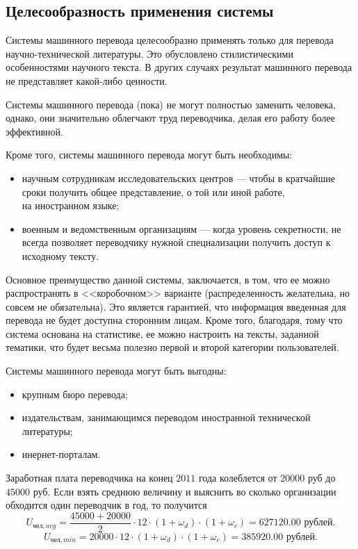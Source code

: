 
\subsection{Целесообразность применения системы}

Системы машинного перевода целесообразно применять только для перевода 
научно-технической литературы. 
Это обусловлено стилистическими особенностями научного текста. 
В других случаях результат машинного перевода
не представляет какой-либо ценности.

Системы машинного перевода (пока) не могут полностью заменить человека,
однако, они значительно облегчают труд переводчика, делая его работу более 
эффективной. 

\pagebreak

Кроме того, системы машинного перевода могут быть необходимы:
\begin{itemize}
	\item  научным сотрудникам исследовательских центров --- чтобы в кратчайшие сроки получить 
			общее представление, о той или иной работе, \\ на иностранном языке;
	\item  военным и ведомственным организациям --- когда уровень секретности, 
		не всегда позволяет переводчику нужной специализации получить доступ к исходному тексту.
\end{itemize}
Основное преимущество данной системы, заключается, в том, 
что ее можно распространять в <<коробочном>> варианте
(распределенность желательна, но совсем не обязательна).
Это является гарантией, что информация введенная для перевода 
не будет доступна сторонним лицам.
Кроме того, благодаря, тому что система основана на статистике, 
ее можно настроить на тексты, заданной тематики,
что будет весьма полезно первой и второй категории пользователей.

Системы машинного перевода могут быть выгодны:
\begin{itemize}
	\item  крупным бюро перевода;
	\item  издательствам, занимающимся переводом иностранной технической литературы;
	\item  инернет-порталам.
\end{itemize}

Заработная плата переводчика на конец $2011$ года колеблется от $20000$ руб до $45000$ руб.
Если взять среднюю величину и выяснить во сколько организации обходится один переводчик в год,
то получится
\[
	U_{\text{чел}, avg} = 
		\dfrac{45000 + 20000}{2}  \cdot 12  \cdot (1 + \omega_{d}) 
		\cdot  (1 + \omega_{c}) = 627120.00  \text{ рублей}.
\]\[
	U_{\text{чел}, min} = 
		20000  \cdot 12 \cdot (1 + \omega_{d}) 
		\cdot  (1 + \omega_{c}) = 385920.00  \text{ рублей}.
\]

